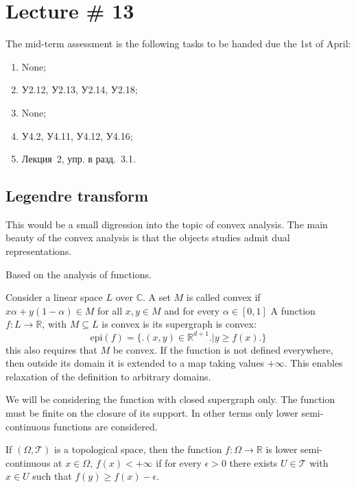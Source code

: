\documentclass[a4paper]{article}
\newcommand{\Real}{\mathbb{R}}
\newcommand{\Cplx}{\mathbb{C}}
\newcommand{\Tcal}{\mathcal{T}}
\newcommand{\rus}[1]{\foreignlanguage{russian}{#1}}
\begin{document}


\section{Lecture \# 13} %
\label{sec:lecture_13}

The mid-term assessment is the following tasks to be handed due the 1st of April:
\begin{enumerate}
	\item None;
	\item \rus{У2.12, У2.13, У2.14, У2.18};
	\item None;
	\item \rus{У4.2, У4.11, У4.12, У4.16};
	\item \rus{Лекция~2, упр. в разд.~3.1}.
\end{enumerate}

\subsection{Legendre transform} %
\label{sub:legendre_transform}

This would be a small digression into the topic of convex analysis. The main beauty of the
convex analysis is that the objects studies admit dual representations.

Based on the analysis of functions.

Consider a linear space $L$ over $\Cplx$. A set $M$ is called convex if $x\alpha + y (1-\alpha)\in M$ for all $x,y\in M$ and for every $\alpha\in [0,1]$
A function $f: L\to \Real$, with $M\subseteq L$ is convex is its supergraph is convex:
\[\text{epi}(f) = \big\{\big. (x,y)\in \Real^{d+1} \big.\big\lvert y\geq f(x)\big.\big\}\]
this also requires that $M$ be convex.
If the function is not defined everywhere, then outside its domain it is extended to a map taking values $+\infty$.
This enables relaxation of the definition to arbitrary domains.

We will be considering the function with closed supergraph only. The function must be finite on the closure of its support.
In other terms only lower semi-continuous functions are considered.

If $(\Omega,\Tcal)$ is a topological space, then the function $f:\Omega\to\Real$ is lower semi-continuous at
$x\in \Omega$, $f(x)<+\infty$ if for every $\epsilon>0$ there exists $U\in \Tcal$ with $x\in U$ such that $f(y)\geq f(x)-\epsilon$.
\end{document}
